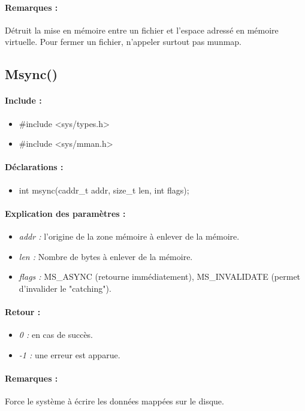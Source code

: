 \documentclass{article}[12pt]
\begin{document}
\paragraph{Remarques : }
Détruit la mise en mémoire entre un fichier et l'espace adressé en mémoire virtuelle. Pour fermer un fichier, n'appeler surtout pas munmap. 
\subsection{Msync()}
\paragraph{Include : }
\begin{itemize}
	\item \#include <sys/types.h>
	\item \#include <sys/mman.h>
\end{itemize}
\paragraph{Déclarations : }
\begin{itemize}
	\item int msync(caddr\_t addr, size\_t len, int flags);
\end{itemize}
\paragraph{Explication des paramètres : }
\begin{itemize}
	\item \emph{addr : } l'origine de la zone mémoire à enlever de la mémoire.
	\item \emph{len : } Nombre de bytes à enlever de la mémoire.
	\item \emph{flags : } MS\_ASYNC (retourne immédiatement), MS\_INVALIDATE (permet d'invalider le "catching").
\end{itemize}
\paragraph{Retour : }
\begin{itemize}
	\item \emph{0 : } en cas de succès.
	\item \emph{-1 : } une erreur est apparue.
\end{itemize}
\paragraph{Remarques : }
Force le système à écrire les données mappées sur le disque.
\end{document}
